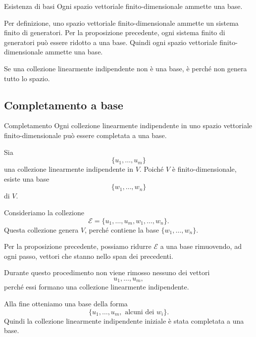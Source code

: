 \documentclass[a4paper]{article}
\begin{document}
\begin{snippetcorollary}{Esistenza di basi}
    Ogni spazio vettoriale finito-dimensionale ammette una base.
\end{snippetcorollary}

\begin{snippetproof}{}
    Per definizione, uno spazio vettoriale finito-dimensionale ammette un sistema finito di generatori. Per la proposizione precedente, ogni sistema finito di generatori può essere ridotto a una base. Quindi ogni spazio vettoriale finito-dimensionale ammette una base.
\end{snippetproof}

Se una collezione linearmente indipendente non è una base, è perché non genera tutto lo spazio.

\subsection{Completamento a base}

\begin{snippetproposition}{Completamento}
    Ogni collezione linearmente indipendente in uno spazio vettoriale finito-dimensionale può essere completata a una base.
\end{snippetproposition}

\begin{snippetproof}{}
    Sia
    \[
        \{u_1,\ldots,u_m\}
    \]
    una collezione linearmente indipendente in \(V\). Poiché \(V\) è finito-dimensionale, esiste una base
    \[
        \{w_1,\ldots,w_n\}
    \]
    di \(V\).

    Consideriamo la collezione
    \[
        \mathcal{E}=\{u_1,\ldots,u_m,w_1,\ldots,w_n\}.
    \]
    Questa collezione genera \(V\), perché contiene la base \(\{w_1,\ldots,w_n\}\).

    Per la proposizione precedente, possiamo ridurre \(\mathcal{E}\) a una base rimuovendo, ad ogni passo, vettori che stanno nello span dei precedenti.

    Durante questo procedimento non viene rimosso nessuno dei vettori
    \[
        u_1,\ldots,u_m,
    \]
    perché essi formano una collezione linearmente indipendente.

    Alla fine otteniamo una base della forma
    \[
        \{u_1,\ldots,u_m,\text{ alcuni dei }w_i\}.
    \]
    Quindi la collezione linearmente indipendente iniziale è stata completata a una base.
\end{snippetproof}
\end{document}
